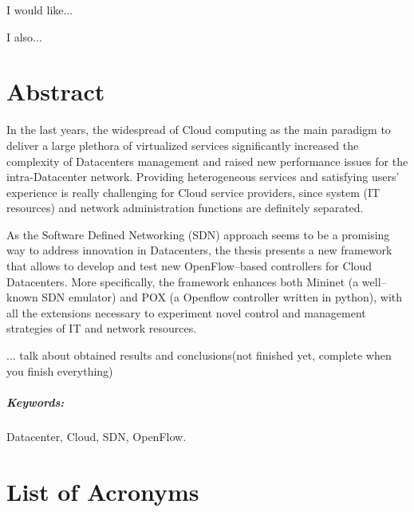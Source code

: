 \documentclass[12pt,english]{book}
\begin{document}

\noindent I would like...

\medskip{}
\noindent I also...

\chapter*{Abstract}


\begin{singlespace}
In the last years, the widespread of Cloud computing as the main paradigm to deliver a large plethora of virtualized services significantly increased the complexity of Datacenters management and raised new performance issues for the intra-Datacenter network.
Providing heterogeneous services and satisfying users' experience is really challenging for Cloud service providers, since system (IT resources) and network administration functions are definitely separated.

As the Software Defined Networking (SDN) approach seems to be a promising way to address innovation in Datacenters, the thesis presents a new framework that allows to develop and test new OpenFlow--based controllers for Cloud Datacenters.
More specifically, the framework enhances both Mininet (a well--known SDN emulator) and POX (a Openflow controller written in python), with all the extensions necessary to experiment novel control and management strategies of IT and network resources.

... talk about obtained results and conclusions(not finished yet, complete when you finish everything)

\end{singlespace}

\paragraph{Keywords:}
Datacenter, Cloud, SDN, OpenFlow.

\newpage

\cleardoublepage

\tableofcontents{}

\cleardoublepage

\chapter*{List of Acronyms}
\end{document}
